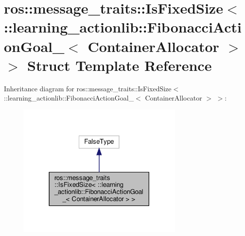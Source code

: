 \hypertarget{structros_1_1message__traits_1_1IsFixedSize_3_01_1_1learning__actionlib_1_1FibonacciActionGoal__8b3dc56aa19f3055b5edda3573a1f092}{}\section{ros\+:\+:message\+\_\+traits\+:\+:Is\+Fixed\+Size$<$ \+:\+:learning\+\_\+actionlib\+:\+:Fibonacci\+Action\+Goal\+\_\+$<$ Container\+Allocator $>$ $>$ Struct Template Reference}
\label{structros_1_1message__traits_1_1IsFixedSize_3_01_1_1learning__actionlib_1_1FibonacciActionGoal__8b3dc56aa19f3055b5edda3573a1f092}


Inheritance diagram for ros\+:\+:message\+\_\+traits\+:\+:Is\+Fixed\+Size$<$ \+:\+:learning\+\_\+actionlib\+:\+:Fibonacci\+Action\+Goal\+\_\+$<$ Container\+Allocator $>$ $>$\+:
\nopagebreak
\begin{figure}[H]
\begin{center}
\leavevmode
\includegraphics[width=234pt]{structros_1_1message__traits_1_1IsFixedSize_3_01_1_1learning__actionlib_1_1FibonacciActionGoal__bcc73b8d3dd5408845be3e88d45361a3}
\end{center}
\end{figure}


